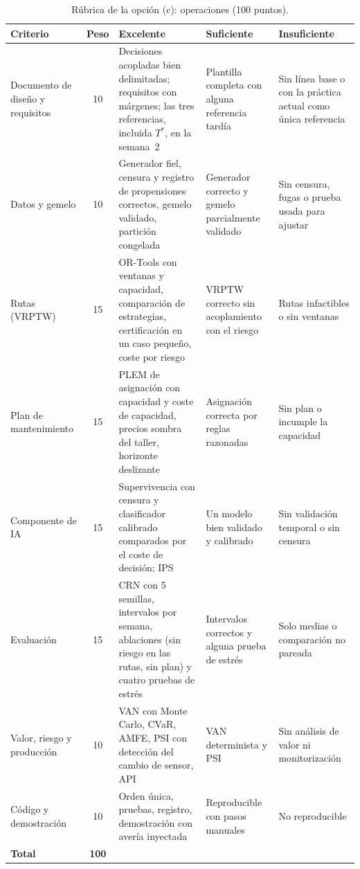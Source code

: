 \begin{table}[p]
\centering\footnotesize
\caption{Rúbrica de la opción (c): operaciones (100 puntos).}\label{tab:rubrica-c}
\begin{tabularx}{\textwidth}{@{}>{\raggedright\arraybackslash}p{2.5cm}c>{\raggedright\arraybackslash}X>{\raggedright\arraybackslash}X>{\raggedright\arraybackslash}X@{}}
\toprule
Criterio & Peso & Excelente & Suficiente & Insuficiente \\
\midrule
Documento de diseño y requisitos & 10 & Decisiones acopladas bien delimitadas; requisitos con márgenes; las tres referencias, incluida $T^{\ast}$, en la semana~2 & Plantilla completa con alguna referencia tardía & Sin línea base o con la práctica actual como única referencia \\
\addlinespace
Datos y gemelo & 10 & Generador fiel, censura y registro de propensiones correctos, gemelo validado, partición congelada & Generador correcto y gemelo parcialmente validado & Sin censura, fugas o prueba usada para ajustar \\
\addlinespace
Rutas (VRPTW) & 15 & OR-Tools con ventanas y capacidad, comparación de estrategias, certificación en un caso pequeño, coste por riesgo & VRPTW correcto sin acoplamiento con el riesgo & Rutas infactibles o sin ventanas \\
\addlinespace
Plan de mantenimiento & 15 & PLEM de asignación con capacidad y coste de capacidad, precios sombra del taller, horizonte deslizante & Asignación correcta por reglas razonadas & Sin plan o incumple la capacidad \\
\addlinespace
Componente de IA & 15 & Supervivencia con censura y clasificador calibrado comparados por el coste de decisión; IPS & Un modelo bien validado y calibrado & Sin validación temporal o sin censura \\
\addlinespace
Evaluación & 15 & CRN con 5 semillas, intervalos por semana, ablaciones (sin riesgo en las rutas, sin plan) y cuatro pruebas de estrés & Intervalos correctos y alguna prueba de estrés & Solo medias o comparación no pareada \\
\addlinespace
Valor, riesgo y producción & 10 & VAN con Monte Carlo, CVaR, AMFE, PSI con detección del cambio de sensor, API & VAN determinista y PSI & Sin análisis de valor ni monitorización \\
\addlinespace
Código y demostración & 10 & Orden única, pruebas, registro, demostración con avería inyectada & Reproducible con pasos manuales & No reproducible \\
\midrule
\textbf{Total} & \textbf{100} & & & \\
\bottomrule
\end{tabularx}
\end{table}

